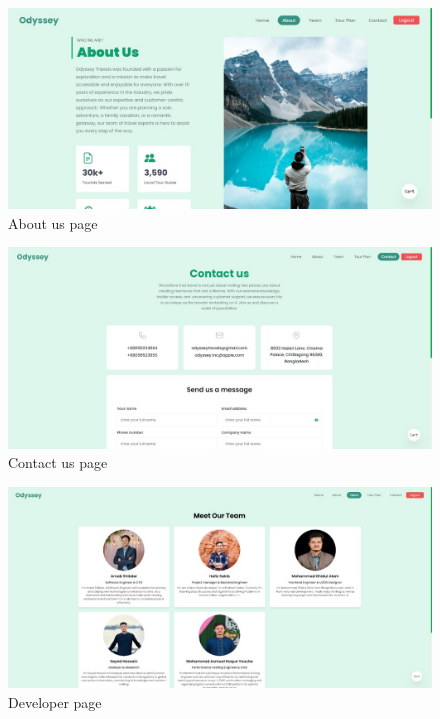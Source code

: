 \documentclass{scrreprt}
\begin{document}
\begin{figure}[h!]
    \centering
    \includegraphics[width=1.1\textwidth, height=0.4\textheight]{./SS/about.jpg}
    \caption{About us page}
    \label{fig:about}
\end{figure}

\begin{figure}[h!]
    \centering
    \includegraphics[width=1.1\textwidth, height=0.4\textheight]{./SS/contact_us.jpg}
    \caption{Contact us page}
    \label{fig:contact_us}
\end{figure}

\begin{figure}[h!]
    \centering
    \includegraphics[width=1.1\textwidth, height=0.4\textheight]{./SS/developer.jpg}
    \caption{Developer page}
    \label{fig:developer}
\end{figure}
\end{document}
